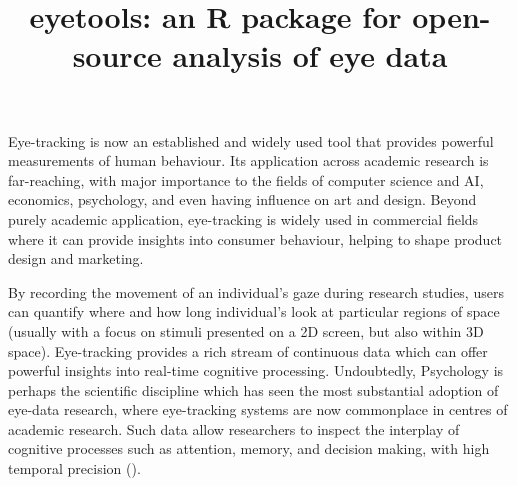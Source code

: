 \documentclass[
  man,
  floatsintext,
  longtable,
  nolmodern,
  notxfonts,
  notimes,
  colorlinks=true,linkcolor=blue,citecolor=blue,urlcolor=blue]{apa7}
\title{eyetools: an R package for open-source analysis of eye data}
\affiliation{
{Lancaster University}}
\begin{document}
\maketitle


\setcounter{secnumdepth}{-\maxdimen} %

\setlength\LTleft{0pt}

\resetlinenumber[1]

Eye-tracking is now an established and widely used tool that provides
powerful measurements of human behaviour. Its application across
academic research is far-reaching, with major importance to the fields
of computer science and AI, economics, psychology, and even having
influence on art and design. Beyond purely academic application,
eye-tracking is widely used in commercial fields where it can provide
insights into consumer behaviour, helping to shape product design and
marketing.

By recording the movement of an individual's gaze during research
studies, users can quantify where and how long individual's look at
particular regions of space (usually with a focus on stimuli presented
on a 2D screen, but also within 3D space). Eye-tracking provides a rich
stream of continuous data which can offer powerful insights into
real-time cognitive processing. Undoubtedly, Psychology is perhaps the
scientific discipline which has seen the most substantial adoption of
eye-data research, where eye-tracking systems are now commonplace in
centres of academic research. Such data allow researchers to inspect the
interplay of cognitive processes such as attention, memory, and decision
making, with high temporal precision ().
\end{document}
